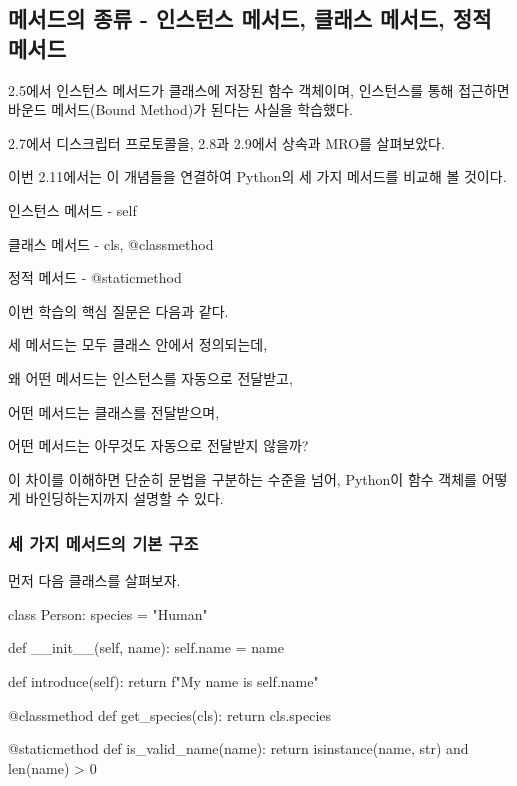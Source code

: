 

\subsection{메서드의 종류 - 인스턴스 메서드, 클래스 메서드, 정적 메서드}

2.5에서 인스턴스 메서드가 클래스에 저장된 함수 객체이며, 인스턴스를 통해 접근하면 바운드 메서드(Bound Method)가 된다는 사실을 학습했다.

2.7에서 디스크립터 프로토콜을, 2.8과 2.9에서 상속과 MRO를 살펴보았다.

이번 2.11에서는 이 개념들을 연결하여 Python의 세 가지 메서드를 비교해 볼 것이다.

\begin{dhksmry}
    인스턴스 메서드 - self

    클래스 메서드 - cls, @classmethod

    정적 메서드 - @staticmethod
\end{dhksmry}

이번 학습의 핵심 질문은 다음과 같다.

\begin{dhksmry}[centered]
세 메서드는 모두 클래스 안에서 정의되는데,

왜 어떤 메서드는 인스턴스를 자동으로 전달받고,

어떤 메서드는 클래스를 전달받으며,

어떤 메서드는 아무것도 자동으로 전달받지 않을까?
\end{dhksmry}

이 차이를 이해하면 단순히 문법을 구분하는 수준을 넘어, Python이 함수 객체를 어떻게 바인딩하는지까지 설명할 수 있다.

\subsubsection{세 가지 메서드의 기본 구조}

먼저 다음 클래스를 살펴보자.

\begin{dhkcode}
class Person:
    species = "Human"

    def __init__(self, name):
        self.name = name

    def introduce(self):
        return f"My name is {self.name}"

    @classmethod
    def get_species(cls):
        return cls.species

    @staticmethod
    def is_valid_name(name):
        return isinstance(name, str) and len(name) > 0
\end{dhkcode}

